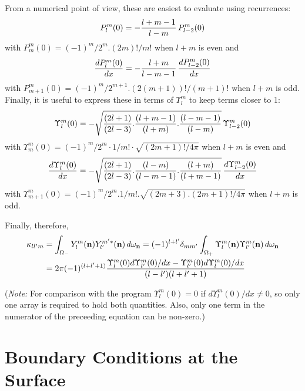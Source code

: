 From a numerical point of view, these are easiest to evaluate using
recurrences:
\begin{equation}
P_l^m(0) = - {{l+m-1}\over{l-m}} \, P_{l-2}^m (0)
\end{equation}
with $P_m^m(0)=(-1)^m/2^m . (2m)! /m!$ when $l+m$ is even and
\begin{equation}
{ {d P_l^m(0)} \over {dx}} = - {{l+m}\over{l-m-1}} \, {{dP_{l-2}^m (0)} 
\over {dx}}
\end{equation}
with $P_{m+1}^m(0)=(-1)^m/2^{m+1}. (2(m+1))!/(m+1)!$ when $l+m$ is odd.
Finally, it is useful to express these in terms of $\Upsilon_l^m$ to keep
terms closer to 1:
\begin{equation}
\Upsilon_l^m(0) = -\sqrt {{{(2l+1)}\over{(2l-3)}} . {{(l+m-1)}\over{(l+m)}} .
{{(l-m-1)}\over{(l-m)}}} 
\,\Upsilon_{l-2}^m (0)
\end{equation}
with $\Upsilon_m^m(0)=(-1)^m/2^m \cdot 1/m! \cdot \sqrt {(2m+1)! / {4\pi}}$ 
when $l+m$ is even and
\begin{equation}
{ {d \Upsilon_l^m(0)} \over {dx}} = -\sqrt {{{(2l+1)}\over{(2l-3)}} .
{{(l-m)}\over{(l-m-1)}} .{{(l+m)}\over{(l+m-1)}}}
\, {{d\Upsilon_{l-2}^m (0)}
\over {dx}}
\end{equation}
with $\Upsilon_{m+1}^m(0)=(-1)^m/2^m . 1/m! . \sqrt {(2m+3).
(2m+1)! / {4\pi}}$ when $l+m$ is odd.

Finally, therefore,
\begin{equation}
\begin{split}
\kappa_{ll'm} &= \int_{\Omega_-} Y_l^m (\mathbf{n}) Y_{l'}^{m'*} (\mathbf{n}) \, d\omega_{\mathbf{n}}
= (-1)^{l+l'} \delta_{mm'} \int_{\Omega_+} \Upsilon_l^m (\mathbf{n}) 
\Upsilon_{l'}^{m} (\mathbf{n}) \, d\omega_{\mathbf{n}} \\
&= 2\pi (-1)^{(l+l'+1)} { {\Upsilon_l^m (0){d\Upsilon_{l'}^m (0)/dx} 
- \Upsilon_{l'}^m (0){d\Upsilon_l^m (0)/dx}}\over{(l-l')(l+l'+1)}}
\end{split}
\end{equation}

({\em Note:} For comparison with the program $\Upsilon_l^m(0)=0$ if 
$d\Upsilon_l^m(0)/dx \not = 0$, so only one array is required to hold
both quantities. Also, only one term in the numerator of the preceeding 
equation can be non-zero.)

\section{Boundary Conditions at the Surface}

